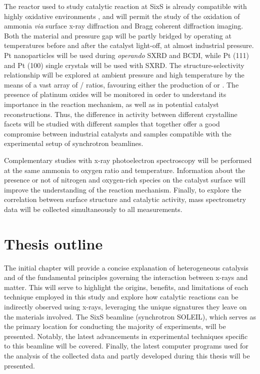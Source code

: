 The reactor used to study catalytic reaction at SixS is already compatible with highly oxidative environments \parencite{VanRijn2010, Resta2020a}, and will permit the study of the oxidation of ammonia \textit{via} surface x-ray diffraction and Bragg coherent diffraction imaging.
Both the material and pressure gap will be partly bridged by operating at temperatures before and after the catalyst light-off, at almost industrial pressure.
Pt nanoparticles will be used during \textit{operando} SXRD and BCDI, while Pt (111) and Pt (100) single crystals will be used with SXRD.
The structure-selectivity relationship will be explored at ambient pressure and high temperature by the means of a vast array of / ratios, favouring either the production of  or .
The presence of platinum oxides will be monitored in order to understand its importance in the reaction mechanism, as well as in potential catalyst reconstructions.
Thus, the difference in activity between different crystalline facets will be studied with different samples that together offer a good compromise between industrial catalysts and samples compatible with the experimental setup of synchrotron beamlines.

Complementary studies with x-ray photoelectron spectroscopy will be performed at the same ammonia to oxygen ratio and temperature.
Information about the presence or not of nitrogen and oxygen-rich species on the catalyst surface will improve the understanding of the reaction mechanism.
Finally, to explore the correlation between surface structure and catalytic activity, mass spectrometry data will be collected simultaneously to all measurements.

\section{Thesis outline}

The initial chapter will provide a concise explanation of heterogeneous catalysis and of the fundamental principles governing the interaction between x-rays and matter.
This will serve to highlight the origins, benefits, and limitations of each technique employed in this study and explore how catalytic reactions can be indirectly observed using x-rays, leveraging the unique signatures they leave on the materials involved.
The SixS beamline (synchrotron SOLEIL), which serves as the primary location for conducting the majority of experiments, will be presented.
Notably, the latest advancements in experimental techniques specific to this beamline will be covered.
Finally, the latest computer programs used for the analysis of the collected data and partly developed during this thesis will be presented.

